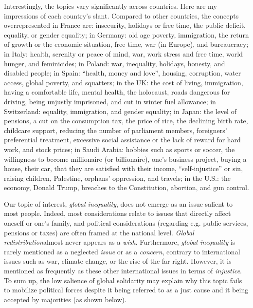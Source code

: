 \documentclass[12pt,english]{article}
\begin{document}
\begin{bibunit}
Interestingly, the topics vary significantly across countries. Here are my impressions of each country's slant. Compared to other countries, the concepts overrepresented in France are: insecurity, holidays or free time, the public deficit, equality, or gender equality; in Germany: old age poverty, immigration, the return of growth or the economic situation, free time, war (in Europe), and bureaucracy; in Italy: health, serenity or peace of mind, war, work stress and free time, world hunger, and feminicides; in Poland: war, inequality, holidays, honesty, and disabled people; in Spain: ``health, money and love'', housing, corruption, water access, global poverty, and squatters; in the UK: the cost of living, immigration, having a comfortable life, mental health, the holocaust, roads dangerous for driving, being unjustly imprisoned, and cut in winter fuel allowance; in Switzerland: equality, immigration, and gender equality; in Japan: the level of pensions, a cut on the consumption tax, the price of rice, the declining birth rate, childcare support, reducing the number of parliament members, foreigners' preferential treatment, excessive social assistance or the lack of reward for hard work, and stock prices; in Saudi Arabia: hobbies such as sports or soccer, the willingness to become millionaire (or billionaire), one's business project, buying a house, their car, that they are satisfied with their income, ``self-injustice'' or sin, raising children, Palestine, orphans' oppression, and travels; in the U.S.: the economy, Donald Trump, breaches to the Constitution, abortion, and gun control.

Our topic of interest, \textit{global inequality}, does not emerge as an issue salient to most people. Indeed, most considerations relate to issues that directly affect oneself or one's family, and political considerations (regarding e.g. public services, pensions or taxes) are often framed at the national level. \textit{Global redistribution}almost never appears as a \textit{wish}. Furthermore, \textit{global inequality} is rarely mentioned as a neglected \textit{issue} or as a \textit{concern}, contrary to international issues such as war, climate change, or the rise of the far right. However, it is mentioned as frequently as these other international issues in terms of \textit{injustice}. 
To sum up, the low salience of global solidarity may explain why this topic fails to mobilize political forces despite it being referred to as a just cause and it being accepted by majorities (as shown below). 


\end{bibunit}
\end{document}
